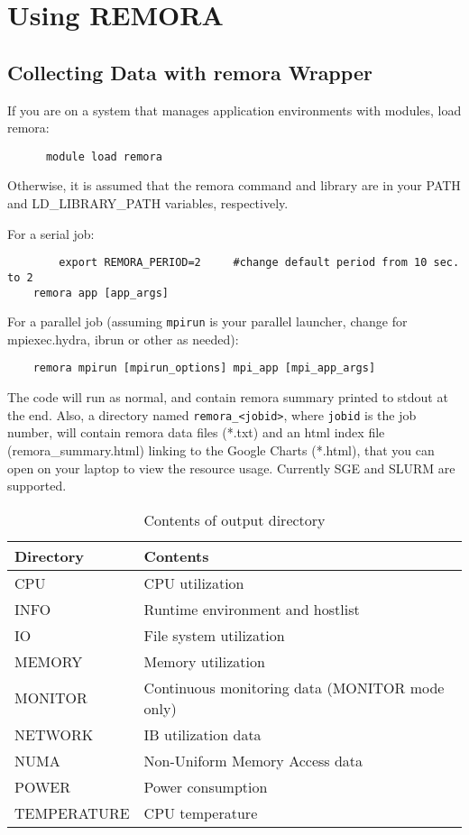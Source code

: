 \documentclass[10pt,a4paper]{report}
\begin{document}
\FloatBarrier
\chapter{Using REMORA}

\section{Collecting Data with remora Wrapper}

If you are on a system that manages application environments with modules, load remora:
\begin{verbatim}
      module load remora
\end{verbatim}
Otherwise, it is assumed that the remora command and library are in your PATH and LD\_LIBRARY\_PATH
variables, respectively.

For a serial job:

\begin{verbatim}
        export REMORA_PERIOD=2     #change default period from 10 sec. to 2
	remora app [app_args]
\end{verbatim} 

For a parallel job (assuming \verb+mpirun+ is your parallel launcher, change for mpiexec.hydra, ibrun or other as needed):

\begin{verbatim}
	remora mpirun [mpirun_options] mpi_app [mpi_app_args]
\end{verbatim} 

The code will run as normal, and contain remora summary printed to stdout at the end. 
Also, a directory named \verb+remora_<jobid>+, where \verb+jobid+ is the job number, 
will contain remora data files (*.txt) and an html index file (remora\_summary.html)
linking to the Google Charts (*.html), that you can open on your laptop
to view the resource usage. Currently SGE and SLURM are supported.

\begin{table}
\begin{center}
\begin{tabular}{|l|l|}
\hline
\bf{Directory} & \bf{Contents}\\\hline
CPU	      & CPU utilization\\\hline
INFO      & Runtime environment and hostlist\\\hline
IO        & File system utilization\\\hline 
MEMORY    & Memory utilization\\\hline
MONITOR   & Continuous monitoring data (MONITOR mode only)\\\hline
NETWORK   & IB utilization data\\\hline
NUMA      & Non-Uniform Memory Access data\\\hline
POWER     & Power consumption\\\hline
TEMPERATURE & CPU temperature\\
\hline
\end{tabular}
\label{tab:outdir}
\caption{Contents of output directory}
\end{center}
\end{table}
\end{document}
